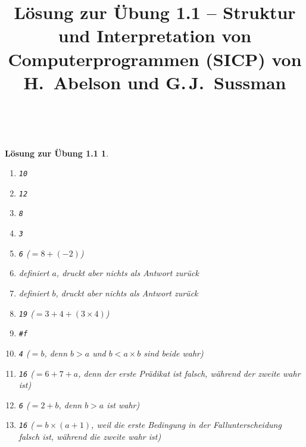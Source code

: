 \documentclass[a4paper,11pt,reqno]{amsart}
\theoremstyle{uremark}
\newtheorem*{loes}{L\"osung zur \"Ubung 1.1}
\begin{document}
\title[]{L\"osung zur \"Ubung 1.1 -- Struktur und Interpretation von
Computerprogrammen (SICP) von H.~Abelson und G.\,J.~Sussman}
\author{\href{https://github.com/pzuehlke}{}}
\maketitle
\

\begin{loes}\ 
\begin{enumerate}[label=\small$\bullet$]
    \item \texttt{10}
    \item \texttt{12}
    \item \texttt{8}
    \item \texttt{3}
    \item \texttt{6} ($ = 8  + (-2)$)
    \item definiert $ a $, druckt aber nichts als Antwort zur\"uck
    \item definiert $ b $, druckt aber nichts als Antwort zur\"uck
    \item \texttt{19} ($ = 3 + 4 + (3 \times 4) $) 
    \item \texttt{\#f}
    \item \texttt{4} ($ = b $, denn $ b > a $ und $ b < a \times b $ sind beide
            wahr)
    \item \texttt{16} ($ = 6 + 7 + a $, denn der erste Pr\"adikat ist
        falsch, w\"ahrend der zweite wahr ist)
    \item \texttt{6} ($ = 2 + b $, denn $ b > a $ ist wahr)
    \item \texttt{16} ($ = b \times (a + 1) $, weil die erste Bedingung in der
        Fallunterscheidung \ttt{cond} falsch ist, w\"ahrend die zweite wahr ist)
\end{enumerate}
\end{loes}
\end{document}
